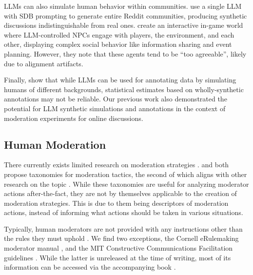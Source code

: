 \acp{LLM} can also simulate human behavior within communities. \textcite{park2022socialsimulacracreatingpopulated} use a single \ac{LLM} with \ac{SDB} prompting to generate entire Reddit communities, producing synthetic discussions indistinguishable from real ones. \textcite{Park2023GenerativeAI} create an interactive in-game world where \ac{LLM}-controlled \acp{NPC} engage with players, the environment, and each other, displaying complex social behavior like information sharing and event planning. However, they note that these agents tend to be “too agreeable”, likely due to alignment artifacts.

Finally, \textcite{Gligoric2024CanUL} show that while \acp{LLM} can be used for annotating data by simulating humans of different backgrounds, statistical estimates based on wholly-synthetic annotations may not be reliable. Our previous work \cite{dtsirmpas_thesis} also demonstrated the potential for \ac{LLM} synthetic simulations and annotations in the context of moderation experiments for online discussions.


\subsection{Human Moderation}

There currently exists limited research on moderation strategies \cite{korre2025evaluation, make_reddit_great}. \textcite{cheung-et-al-2011} and \textcite{park_et_al_2012_facilitation} both propose taxonomies for moderation tactics, the second of which aligns with other research on the topic \cite{seering_self_moderation}. While these taxonomies are useful for analyzing moderator actions after-the-fact, they are not by themselves applicable to the creation of moderation strategies. This is due to them being descriptors of moderation actions, instead of informing what actions should be taken in various situations.

Typically, human moderators are not provided with any instructions other than the rules they must uphold \cite{seering_self_moderation, schaffner_community_guidelines}. We find two exceptions, the Cornell eRulemaking moderator manual \cite{Cornell_eRulemaking2017}, and the MIT Constructive Communications Facilitation guidelines \cite{dimitra-guide}. While the latter is unreleased at the time of writing, most of its information can be accessed via the accompanying book \cite{dimitra-book}.

